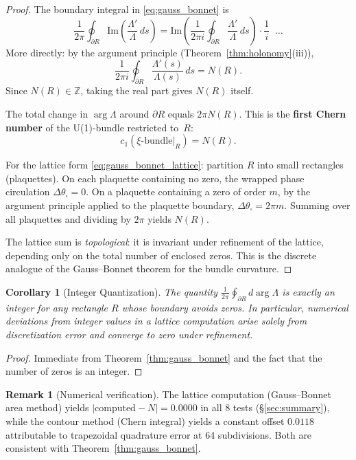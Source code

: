 \documentclass[11pt, a4paper]{article}
\theoremstyle{definition}
\newtheorem{remark}{Remark}[section]
\theoremstyle{plain}
\newtheorem{corollary}[theorem]{Corollary}
\newcommand{\xif}{\xi}                      %
\begin{document}
\begin{proof}
The boundary integral in \eqref{eq:gauss_bonnet} is
\[
  \frac{1}{2\pi}\oint_{\partial R}
  \mathrm{Im}\!\left(\frac{\Lambda'}{\Lambda}\,ds\right)
  = \mathrm{Im}\!\left(\frac{1}{2\pi i}
  \oint_{\partial R}\frac{\Lambda'}{\Lambda}\,ds\right)
  \cdot \frac{1}{i} \;\; \ldots
\]
More directly: by the argument principle
(Theorem~\ref{thm:holonomy}(iii)),
\[
  \frac{1}{2\pi i}\oint_{\partial R}
  \frac{\Lambda'(s)}{\Lambda(s)}\,ds = N(R).
\]
Since $N(R) \in \mathbb{Z}$, taking the real part gives $N(R)$ itself.

The total change in $\arg\Lambda$ around $\partial R$ equals $2\pi N(R)$.
This is the \textbf{first Chern number} of the U(1)-bundle restricted
to~$R$:
\[
  c_1(\xif\text{-bundle}\big|_R) = N(R).
\]

For the lattice form \eqref{eq:gauss_bonnet_lattice}: partition $R$
into small rectangles (plaquettes). On each plaquette containing no
zero, the wrapped phase circulation $\Delta\theta_\square = 0$.
On a plaquette containing a zero of order $m$, by the argument
principle applied to the plaquette boundary,
$\Delta\theta_\square = 2\pi m$. Summing over all plaquettes and
dividing by $2\pi$ yields $N(R)$.

The lattice sum is \emph{topological}: it is invariant under refinement
of the lattice, depending only on the total number of enclosed zeros.
This is the discrete analogue of the Gauss--Bonnet theorem for the
bundle curvature.
\end{proof}

\begin{corollary}[Integer Quantization]
\label{cor:integer_quant}
The quantity $\frac{1}{2\pi}\oint_{\partial R} d\arg\Lambda$
is exactly an integer for \emph{any} rectangle $R$ whose boundary
avoids zeros. In particular, numerical deviations from integer
values in a lattice computation arise solely from discretization
error and converge to zero under refinement.
\end{corollary}

\begin{proof}
Immediate from Theorem~\ref{thm:gauss_bonnet} and the fact that the
number of zeros is an integer.
\end{proof}

\begin{remark}[Numerical verification]
\label{rem:gb_numerical}
The lattice computation (Gauss--Bonnet area method) yields
$|\text{computed} - N| = 0.0000$ in all 8 tests
(\S\ref{sec:summary}), while the contour method (Chern integral)
yields a constant offset $0.0118$ attributable to trapezoidal
quadrature error at 64 subdivisions. Both are consistent with
Theorem~\ref{thm:gauss_bonnet}.
\end{remark}
\end{document}
